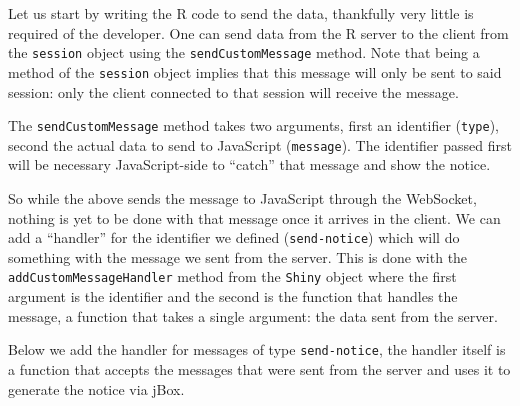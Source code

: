 \documentclass[10pt,]{krantz}
\makeatletter
\newenvironment{Shaded}{\begin{snugshade}}{\end{snugshade}}
\newcommand{\CommentTok}[1]{\textcolor[rgb]{0.37,0.37,0.37}{\textit{#1}}}
\newcommand{\ControlFlowTok}[1]{\textcolor[rgb]{0.27,0.27,0.27}{\textbf{#1}}}
\newcommand{\DataTypeTok}[1]{\textcolor[rgb]{0.27,0.27,0.27}{#1}}
\newcommand{\KeywordTok}[1]{\textcolor[rgb]{0.27,0.27,0.27}{\textbf{#1}}}
\newcommand{\NormalTok}[1]{#1}
\newcommand{\OperatorTok}[1]{\textcolor[rgb]{0.43,0.43,0.43}{\textbf{#1}}}
\newcommand{\StringTok}[1]{\textcolor[rgb]{0.5,0.5,0.5}{#1}}
\newenvironment{kframe}{%
\medskip{}
\setlength{\fboxsep}{.8em}
 \def\at@end@of@kframe{}%
 \ifinner\ifhmode%
  \def\at@end@of@kframe{\end{minipage}}%
  \begin{minipage}{\columnwidth}%
 \fi\fi%
 \def\FrameCommand##1{\hskip\@totalleftmargin \hskip-\fboxsep
 \colorbox{shadecolor}{##1}\hskip-\fboxsep
     \hskip-\linewidth \hskip-\@totalleftmargin \hskip\columnwidth}%
 \MakeFramed {\advance\hsize-\width
   \@totalleftmargin\z@ \linewidth\hsize
   \@setminipage}}%
 {\par\unskip\endMakeFramed%
 \at@end@of@kframe}
\renewenvironment{Shaded}{\begin{kframe}}{\end{kframe}}
\makeatother
\begin{document}
Let us start by writing the R code to send the data, thankfully very little is required of the developer. One can send data from the R server to the client from the \texttt{session} object using the \texttt{sendCustomMessage} method. Note that being a method of the \texttt{session} object implies that this message will only be sent to said session: only the client connected to that session will receive the message.

The \texttt{sendCustomMessage} method takes two arguments, first an identifier (\texttt{type}), second the actual data to send to JavaScript (\texttt{message}). The identifier passed first will be necessary JavaScript-side to ``catch'' that message and show the notice.

\begin{Shaded}
\end{Shaded}

So while the above sends the message to JavaScript through the WebSocket, nothing is yet to be done with that message once it arrives in the client. We can add a ``handler'' for the identifier we defined (\texttt{send-notice}) which will do something with the message we sent from the server. This is done with the \texttt{addCustomMessageHandler} method from the \texttt{Shiny} object where the first argument is the identifier and the second is the function that handles the message, a function that takes a single argument: the data sent from the server.

Below we add the handler for messages of type \texttt{send-notice}, the handler itself is a function that accepts the messages that were sent from the server and uses it to generate the notice via jBox.

\begin{Shaded}
\end{Shaded}
\end{document}
